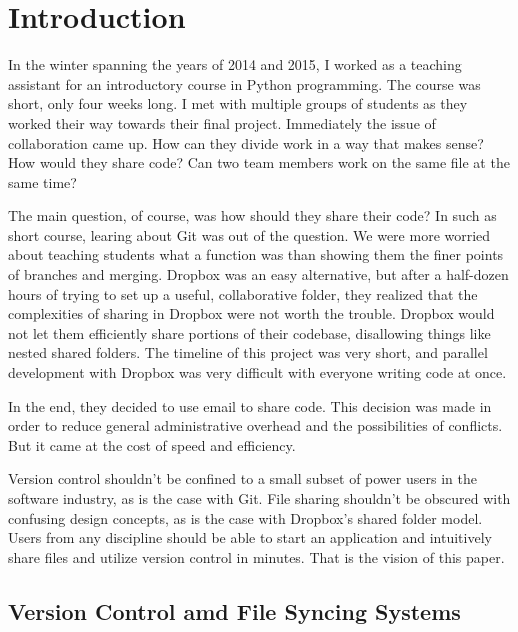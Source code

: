 \chapter{Introduction}

In the winter spanning the years of 2014 and 2015, I worked as a teaching assistant for an introductory course in Python programming. The course was short, only four weeks long. I met with multiple groups of students as they worked their way towards their final project. Immediately the issue of collaboration came up. How can they divide work in a way that makes sense? How would they share code? Can two team members work on the same file at the same time?

The main question, of course, was how should they share their code? In such as short course, learing about Git was out of the question. We were more worried about teaching students what a function was than showing them the finer points of branches and merging. Dropbox was an easy alternative, but after a half-dozen hours of trying to set up a useful, collaborative folder, they realized that the complexities of sharing in Dropbox were not worth the trouble. Dropbox would not let them efficiently share portions of their codebase, disallowing things like nested shared folders. The timeline of this project was very short, and parallel development with Dropbox was very difficult with everyone writing code at once. 

In the end, they decided to use email to share code. This decision was made in order to reduce general administrative overhead and the possibilities of conflicts. But it came at the cost of speed and efficiency.

Version control shouldn't be confined to a small subset of power users in the software industry, as is the case with Git. File sharing shouldn't be obscured with confusing design concepts, as is the case with Dropbox's shared folder model. Users from any discipline should be able to start an application and intuitively share files and utilize version control in minutes. That is the vision of this paper.

\section{Version Control amd File Syncing Systems}

